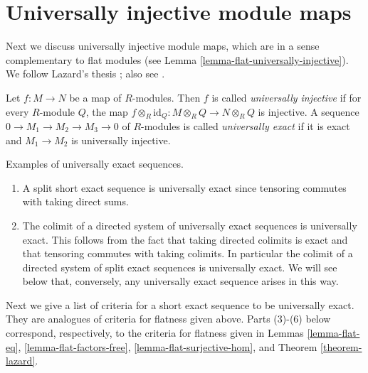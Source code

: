 \section{Universally injective module maps}
\label{section-universally-injective}

\noindent
Next we discuss universally injective module maps, which
are in a sense complementary to flat modules (see Lemma
\ref{lemma-flat-universally-injective}).  We follow Lazard's thesis
\cite{Autour};  also see \cite{Lam}.

\begin{definition}
\label{definition-universally-injective}
Let $f: M \to N$ be a map of $R$-modules.  Then $f$ is called
{\it universally injective} if for every $R$-module $Q$, the map $f
\otimes_R \text{id}_Q: M \otimes_R Q \to N \otimes_R Q$
is injective.  A sequence $0 \to M_1 \to M_2 \to M_3
\to 0$ of $R$-modules is called {\it universally exact} if it is exact
and $M_1 \to M_2$ is universally injective.
\end{definition}

\begin{example}
\label{example-universally-exact}
Examples of universally exact sequences.
\begin{enumerate}
\item A split short exact sequence is universally exact since tensoring
commutes with taking direct sums.
\item The colimit of a directed system of universally exact sequences is
universally exact.  This follows from the fact that taking directed colimits is
exact and that tensoring commutes with taking colimits.  In particular the
colimit of a directed system of split exact sequences is universally exact.  We
will see below that, conversely, any universally exact sequence arises in this
way.
\end{enumerate}
\end{example}

\noindent
Next we give a list of criteria for a short exact sequence to be universally
exact.  They are analogues of criteria for flatness given above.  Parts (3)-(6)
below correspond, respectively, to the criteria for flatness given in
Lemmas \ref{lemma-flat-eq}, \ref{lemma-flat-factors-free},
\ref{lemma-flat-surjective-hom}, and
Theorem \ref{theorem-lazard}.

